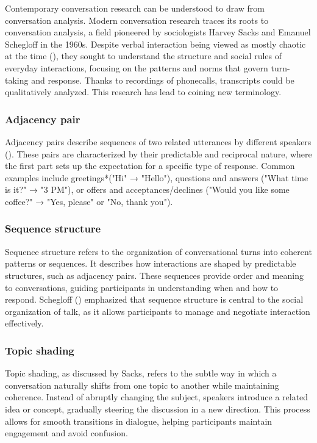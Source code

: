 \documentclass[12pt]{report}
\begin{document}
{\par
Contemporary conversation research can be understood to draw from conversation analysis.
Modern conversation research traces its roots to conversation analysis,
a field pioneered by sociologists Harvey Sacks and Emanuel Schegloff in the 1960s.
Despite verbal interaction being viewed as mostly chaotic at the time (),
they sought to understand the structure and
social rules of everyday interactions,
focusing on the patterns and norms that govern turn-taking and response.
Thanks to recordings of phonecalls,
transcripts could be qualitatively analyzed.
This research has lead to coining new terminology.

    \subsubsection{Adjacency pair}
    \par
    Adjacency pairs describe sequences of two related utterances by different speakers (). These pairs are characterized by their predictable and reciprocal nature, where the first part sets up the expectation for a specific type of response. Common examples include greetings*("Hi" → "Hello"), questions and answers ("What time is it?" → "3 PM"), or offers and acceptances/declines ("Would you like some coffee?" → "Yes, please" or "No, thank you").

    \subsubsection{Sequence structure}
    \par
    Sequence structure refers to the organization of conversational turns into coherent patterns or sequences. It describes how interactions are shaped by predictable structures, such as adjacency pairs. These sequences provide order and meaning to conversations, guiding participants in understanding when and how to respond. Schegloff () emphasized that sequence structure is central to the social organization of talk, as it allows participants to manage and negotiate interaction effectively.

    \subsubsection{Topic shading}
    \par
    Topic shading, as discussed by Sacks, refers to the subtle way in which a conversation naturally shifts from one topic to another while maintaining coherence. Instead of abruptly changing the subject, speakers introduce a related idea or concept, gradually steering the discussion in a new direction. This process allows for smooth transitions in dialogue, helping participants maintain engagement and avoid confusion.

}
\end{document}
